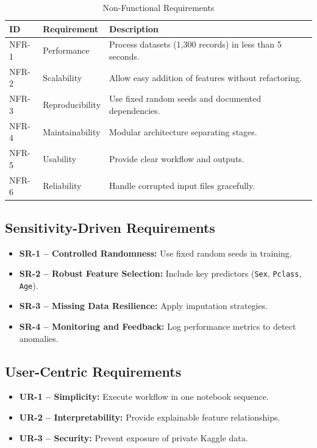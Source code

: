 \documentclass[12pt]{report}
\begin{document}
\begin{table}[H]
\centering
\begin{tabular}{|p{1cm}|p{4cm}|p{9cm}|}
\hline
\textbf{ID} & \textbf{Requirement} & \textbf{Description} \\ \hline
NFR-1 & Performance & Process datasets (1,300 records) in less than 5 seconds. \\ \hline
NFR-2 & Scalability & Allow easy addition of features without refactoring. \\ \hline
NFR-3 & Reproducibility & Use fixed random seeds and documented dependencies. \\ \hline
NFR-4 & Maintainability & Modular architecture separating stages. \\ \hline
NFR-5 & Usability & Provide clear workflow and outputs. \\ \hline
NFR-6 & Reliability & Handle corrupted input files gracefully. \\ \hline
\end{tabular}
\caption{Non-Functional Requirements}
\end{table}

\subsection*{Sensitivity-Driven Requirements}

\begin{itemize}
    \item \textbf{SR-1 – Controlled Randomness:} Use fixed random seeds in training.
    \item \textbf{SR-2 – Robust Feature Selection:} Include key predictors (\texttt{Sex}, \texttt{Pclass}, \texttt{Age}).
    \item \textbf{SR-3 – Missing Data Resilience:} Apply imputation strategies.
    \item \textbf{SR-4 – Monitoring and Feedback:} Log performance metrics to detect anomalies.
\end{itemize}

\subsection*{User-Centric Requirements}

\begin{itemize}
    \item \textbf{UR-1 – Simplicity:} Execute workflow in one notebook sequence.
    \item \textbf{UR-2 – Interpretability:} Provide explainable feature relationships.
    \item \textbf{UR-3 – Security:} Prevent exposure of private Kaggle data.
\end{itemize}
\end{document}
